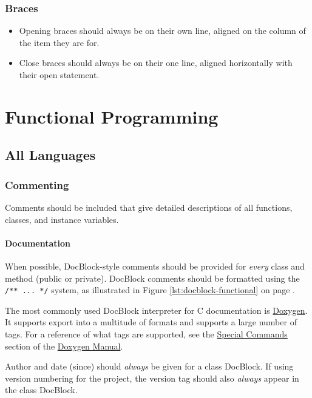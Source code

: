\documentclass[12pt,letter]{memoir} %
\begin{document}
		\subsection{Braces}
			\begin{itemize}
				\item Opening braces should always be on their own line, aligned
					on the column of the item they are for.
				\item Close braces should always be on their one line, aligned
					horizontally with their open statement.
			\end{itemize}

\chapter{Functional Programming}
	\section{All Languages}
		\subsection{Commenting}
			Comments should be included that give detailed descriptions of all functions,
			classes, and instance variables.
			\subsubsection{Documentation}
				When possible, DocBlock-style comments should be provided for \emph{every} class and
				method (public or private). DocBlock comments should be formatted using the
				\texttt{/** ... */} system, as illustrated in Figure \ref{lst:docblock-functional} on page \pageref{lst:docblock-functional}.
				
				The most commonly used DocBlock interpreter for C documentation is
				\href{http://www.stack.nl/~dimitri/doxygen/}{Doxygen}. It supports export into a
				multitude of formats and supports a large number of tags. For a reference of
				what tags are supported, see the \href{http://www.stack.nl/~dimitri/doxygen/manual/commands.html}{Special Commands}
				section of the \href{http://www.stack.nl/~dimitri/doxygen/manual/index.html}{Doxygen Manual}.
				
				Author and date (since) should \emph{always} be given for a class DocBlock. If using
				version numbering for the project, the version tag should also \emph{always} appear
				in the class DocBlock.
				
\end{document}
